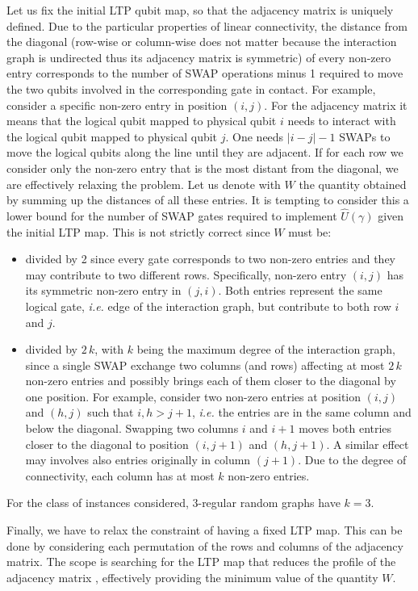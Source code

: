 \documentclass[%
onecolumn,pra,
superscriptaddress,
nofootinbib,
 amsmath,amssymb,
 aps,
11pt,
]{revtex4-1}
\begin{document}
Let us fix the initial LTP qubit map, so that the adjacency matrix is uniquely defined.
Due to the particular properties of linear connectivity, the distance from the diagonal (row-wise or column-wise does not matter because the interaction graph is undirected thus its adjacency matrix is symmetric) of every non-zero entry corresponds to the number of SWAP operations minus 1 required to move the two qubits involved in the corresponding gate in contact. For example, consider a specific non-zero entry in position $(i,j)$. For the adjacency matrix it means that the logical qubit mapped to physical qubit $i$ needs to interact with the logical qubit mapped to physical qubit $j$. One needs $|i-j|-1$ SWAPs to move the logical qubits along the line until they are adjacent.
If for each row we consider only the non-zero entry that is the most distant from the diagonal, we are effectively relaxing the problem. Let us denote with $W$ the quantity obtained by summing up the distances of all these entries.
It is tempting to consider this a lower bound for the number of SWAP gates required to implement $\hat{U}(\gamma)$ given the initial LTP map. This is not strictly correct since $W$ must be:
\begin{itemize}
\item  divided by 2 since every gate corresponds to two non-zero entries and they may contribute to two different rows. Specifically, non-zero entry $(i,j)$ has its symmetric non-zero entry in $(j,i)$. Both entries represent the same logical gate, \emph{i.e.} edge of the interaction graph, but contribute to both row $i$ and $j$.
\item  divided by $2\,k$, with $k$ being the maximum degree of the interaction graph, since a single SWAP exchange two columns (and rows) affecting at most $2\,k$ non-zero entries and possibly brings each of them closer to the diagonal by one position.
For example, consider two non-zero entries at position $(i,j)$ and $(h,j)$ such that $i,h>j+1$, \emph{i.e.} the entries are in the same column and below the diagonal. Swapping two columns $i$ and $i+1$ moves both entries closer to the diagonal to position $(i,j+1)$ and $(h,j+1)$.
A similar effect may involves also entries originally in column $(j+1)$. Due to the degree of connectivity, each column has at most $k$ non-zero entries.
\end{itemize}
For the class of instances considered, 3-regular random graphs have $k=3$.

Finally, we have to relax the constraint of having a fixed LTP map. This can be done by considering each permutation of the rows and columns of the adjacency matrix. The scope is searching for the LTP map that reduces the profile of the adjacency matrix \cite{Norman1976}, effectively providing the minimum value of the quantity $W$.
\end{document}
